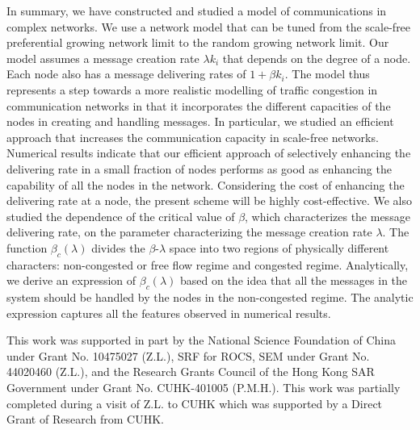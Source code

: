 \documentclass[aps,prl,twocolumn,superscriptaddress,showpacs]{revtex4}
\begin{document}
In summary, we have constructed and studied a model of
communications in complex networks.  We use a network model that
can be tuned from the scale-free preferential growing network
limit to the random growing network limit.  Our model assumes a
message creation rate $\lambda k_i$ that depends on the degree of
a node.  Each node also has a message delivering rates of $1+\beta
k_i$. The model thus represents a step towards a more realistic
modelling of traffic congestion in communication networks in that
it incorporates the different capacities of the nodes in creating
and handling messages. In particular, we studied an efficient
approach that increases the communication capacity in scale-free
networks.  Numerical results indicate that our efficient approach
of selectively enhancing the delivering rate in a small fraction
of nodes performs as good as enhancing the capability of all the
nodes in the network.  Considering the cost of enhancing the
delivering rate at a node, the present scheme will be highly
cost-effective.  We also studied the dependence of the critical
value of $\beta$, which characterizes the message delivering rate,
on the parameter characterizing the message creation rate
$\lambda$.  The function $\beta_{c}(\lambda)$ divides the
$\beta$-$\lambda$ space into two regions of physically different
characters: non-congested or free flow regime and congested
regime.  Analytically, we derive an expression of
$\beta_{c}(\lambda)$ based on the idea that all the messages in
the system should be handled by the nodes in the non-congested
regime.  The analytic expression captures all the features
observed in numerical results.

\acknowledgments This work was supported in part by the National
Science Foundation of China under Grant No. 10475027 (Z.L.), SRF
for ROCS, SEM under Grant No. 44020460 (Z.L.), and the Research
Grants Council of the Hong Kong SAR Government under Grant No.
CUHK-401005 (P.M.H.). This work was partially completed during a
visit of Z.L. to CUHK which was supported by a Direct Grant of
Research from CUHK.
\end{document}
